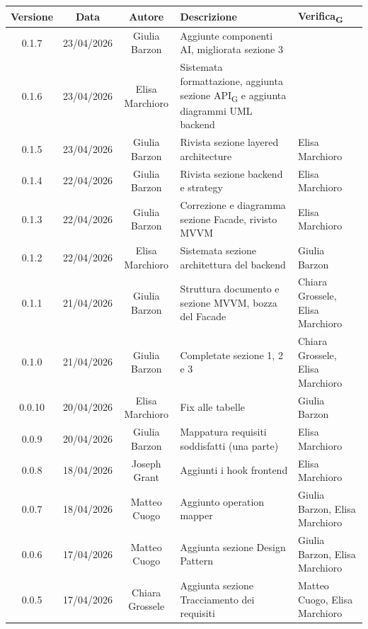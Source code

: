 \documentclass[11pt,a4paper]{article}
\newcommand{\gls}[1]{#1\textsubscript{G}}
\begin{document}
\begin{table}[H]
    \centering          
    \begin{tabular}{|c|c|c|>{\raggedright\arraybackslash}p{}|p{}|}
        \hline
        \textbf{Versione} & \textbf{Data} & \textbf{Autore} & \textbf{Descrizione} & \textbf{\gls{Verifica}} \\
        \hline
        0.1.7 & 23/04/2026 & Giulia Barzon & Aggiunte componenti AI, migliorata sezione 3 & \\
        \hline
        0.1.6 & 23/04/2026 & Elisa Marchioro & Sistemata formattazione, aggiunta sezione \gls{API} e aggiunta diagrammi UML backend & \\
        \hline
        0.1.5 & 23/04/2026 & Giulia Barzon & Rivista sezione layered architecture & Elisa Marchioro\\
        \hline
        0.1.4 & 22/04/2026 & Giulia Barzon & Rivista sezione backend e strategy & Elisa Marchioro\\
        \hline
        0.1.3 & 22/04/2026 & Giulia Barzon & Correzione e diagramma sezione Facade, rivisto MVVM & Elisa Marchioro\\
        \hline
        0.1.2 & 22/04/2026 & Elisa Marchioro & Sistemata sezione architettura del backend & Giulia Barzon \\
        \hline
        0.1.1 & 21/04/2026 & Giulia Barzon & Struttura documento e sezione MVVM, bozza del Facade & Chiara Grossele, Elisa Marchioro\\
        \hline
        0.1.0 & 21/04/2026 & Giulia Barzon & Completate sezione 1, 2 e 3 & Chiara Grossele, Elisa Marchioro\\
        \hline
        0.0.10 & 20/04/2026 & Elisa Marchioro & Fix alle tabelle & Giulia Barzon\\
        \hline
        0.0.9 & 20/04/2026 & Giulia Barzon & Mappatura requisiti soddisfatti (una parte) & Elisa Marchioro\\
        \hline
        0.0.8 & 18/04/2026 & Joseph Grant & Aggiunti i hook frontend & Elisa Marchioro\\
        \hline
        0.0.7 & 18/04/2026 & Matteo Cuogo & Aggiunto operation mapper & Giulia Barzon, Elisa Marchioro\\
        \hline
        0.0.6 & 17/04/2026 & Matteo Cuogo & Aggiunta sezione Design Pattern & Giulia Barzon, Elisa Marchioro\\
        \hline
        0.0.5 & 17/04/2026 & Chiara Grossele & Aggiunta sezione Tracciamento dei requisiti & Matteo Cuogo, Elisa Marchioro\\

\end{tabular}
\end{table}
\end{document}
